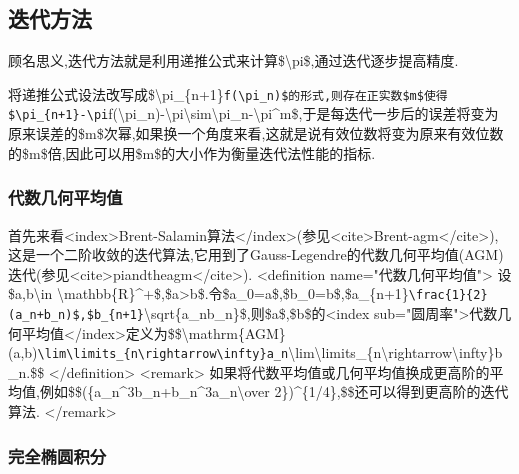 \documentclass[
]{article}
\begin{document}
\hypertarget{ux8fedux4ee3ux65b9ux6cd5}{%
\subsection{迭代方法}\label{ux8fedux4ee3ux65b9ux6cd5}}

顾名思义,迭代方法就是利用递推公式来计算\$\textbackslash pi\$,通过迭代逐步提高精度.

将递推公式设法改写成\$\textbackslash pi\_\{n+1\}\texttt{f(\textbackslash{}pi\_n)\$的形式,则存在正实数\$m\$使得\$\textbar{}\textbackslash{}pi\_\{n+1\}-\textbackslash{}pi\textbar{}}\textbar f(\textbackslash pi\_n)-\textbackslash pi\textbar\textbackslash sim\textbar\textbackslash pi\_n-\textbackslash pi\textbar\^{}m\$,于是每迭代一步后的误差将变为原来误差的\$m\$次幂,如果换一个角度来看,这就是说有效位数将变为原来有效位数的\$m\$倍,因此可以用\$m\$的大小作为衡量迭代法性能的指标.

\hypertarget{ux4ee3ux6570ux51e0ux4f55ux5e73ux5747ux503c}{%
\subsubsection{代数几何平均值}\label{ux4ee3ux6570ux51e0ux4f55ux5e73ux5747ux503c}}

首先来看\textless index\textgreater Brent-Salamin算法\textless/index\textgreater(参见\textless cite\textgreater Brent-agm\textless/cite\textgreater),这是一个二阶收敛的迭代算法,它用到了Gauss-Legendre的代数几何平均值(AGM)迭代(参见\textless cite\textgreater piandtheagm\textless/cite\textgreater).
\textless definition name="代数几何平均值"\textgreater{}
设\$a,b\textbackslash in
\textbackslash mathbb\{R\}\^{}+\$,\$a\textgreater b\$.令\$a\_0=a\$,\$b\_0=b\$,\$a\_\{n+1\}\texttt{\textbackslash{}frac\{1\}\{2\}(a\_n+b\_n)\$,\$b\_\{n+1\}}\textbackslash sqrt\{a\_nb\_n\}\$,则\$a\$,\$b\$的\textless index
sub="圆周率"\textgreater 代数几何平均值\textless/index\textgreater 定义为\$\$\textbackslash mathrm\{AGM\}(a,b)\texttt{\textbackslash{}lim\textbackslash{}limits\_\{n\textbackslash{}rightarrow\textbackslash{}infty\}a\_n}\textbackslash lim\textbackslash limits\_\{n\textbackslash rightarrow\textbackslash infty\}b\_n.\$\$
\textless/definition\textgreater{} \textless remark\textgreater{}
如果将代数平均值或几何平均值换成更高阶的平均值,例如\$\$(\{a\_n\^{}3b\_n+b\_n\^{}3a\_n\textbackslash over
2\})\^{}\{1/4\},\$\$还可以得到更高阶的迭代算法.
\textless/remark\textgreater{}

\hypertarget{ux5b8cux5168ux692dux5706ux79efux5206}{%
\subsubsection{完全椭圆积分}\label{ux5b8cux5168ux692dux5706ux79efux5206}}
\end{document}
